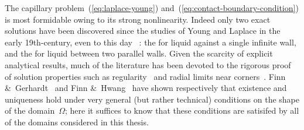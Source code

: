 The capillary problem~(\ref{eq:laplace-young})
and~(\ref{eq:contact-boundary-condition})
is most formidable owing to its strong nonlinearity.
Indeed only two exact solutions have been discovered
since the studies of Young and Laplace
in the early 19th-century,
even to this day~%
  \cite{anderson-2006-exact-solutions-laplace-young}:
the  for liquid against a single infinite wall,
and the  for liquid between two parallel walls.
Given the scarcity of explicit analytical results,
much of the literature has been devoted
to the rigorous proof of solution properties
such as
regularity~\cite{
  gerhardt-1976-global-regularity-solutions-capillarity,
  gerhardt-1980-free-bvp-capillary-surfaces,
  simon-1980-regularity-capillary-surfaces-corners,
  tam-1986-regularity-capillary-corners-borderline
}
and
radial limits near corners~\cite{
  crenshaw-2018-generalization-radial-limits-bounded,
  entekhabi-2017-radial-limits-capillary-corners,
  lancaster-1996-radial-limits-bounded-capillary,
  lancaster-1997-correction-radial-limits-bounded,
  lancaster-2012-remarks-nonparametric-capillary-corners
}.
Finn \&~Gerhardt~\cite{finn-1977-internal-sphere-condition-capillary}
and Finn \&~Hwang~\cite{finn-1989-comparison-principle-capillary-surfaces}
have shown respectively that existence and uniqueness hold
under very general (but rather technical) conditions
on the shape of the domain~$\Omega$;
here it suffices to know that these conditions are satisifed
by all of the domains considered in this thesis.

